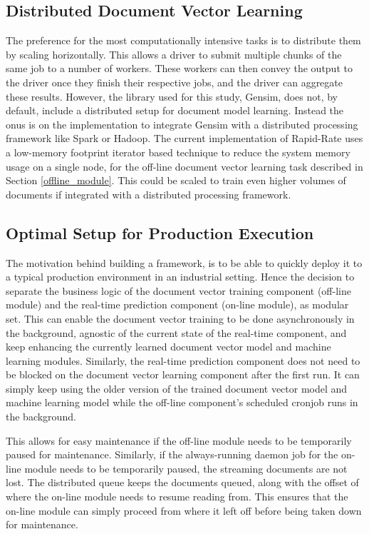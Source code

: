 \documentclass[conference]{IEEEtran}
\begin{document}
    \subsection{Distributed Document Vector Learning} \label{dist_docvec_learning}
        The preference for the most computationally intensive tasks is to distribute them by scaling horizontally.
        This allows a driver to submit multiple chunks of the same job to a number of workers.
        These workers can then convey the output to the driver once they finish their respective jobs, and the driver can aggregate these results.
        However, the library used for this study, Gensim, does not, by default, include a distributed setup for document model learning.
        Instead the onus is on the implementation to integrate Gensim with a distributed processing framework like Spark or Hadoop.
        The current implementation of Rapid-Rate uses a low-memory footprint iterator based technique to reduce the system memory usage on a single node, for the off-line document vector learning task described in Section \ref{offline_module}.
        This could be scaled to train even higher volumes of documents if integrated with a distributed processing framework.

    \subsection{Optimal Setup for Production Execution}
        The motivation behind building a framework, is to be able to quickly deploy it to a typical production environment in an industrial setting.
        Hence the decision to separate the business logic of the document vector training component (off-line module) and the real-time prediction component (on-line module), as modular set.
        This can enable the document vector training to be done asynchronously in the background, agnostic of the current state of the real-time component, and keep enhancing the currently learned document vector model and machine learning modules.
        Similarly, the real-time prediction component does not need to be blocked on the document vector learning component after the first run.
        It can simply keep using the older version of the trained document vector model and machine learning model while the off-line component's scheduled cronjob runs in the background.

        This allows for easy maintenance if the off-line module needs to be temporarily paused for maintenance.
        Similarly, if the always-running daemon job for the on-line module needs to be temporarily paused, the streaming documents are not lost. 
        The distributed queue keeps the documents queued, along with the offset of where the on-line module needs to resume reading from. 
        This ensures that the on-line module can simply proceed from where it left off before being taken down for maintenance.
\end{document}
